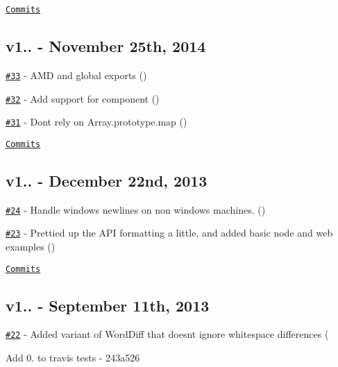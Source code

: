 \href{https://github.com/kpdecker/jsdiff/compare/v1.1.0...v1.2.0}{\tt Commits}

\subsection*{v1.. -\/ November 25th, 2014}


\begin{DoxyItemize}
\item \href{https://github.com/kpdecker/jsdiff/pull/33}{\tt \#33} -\/ A\+MD and global exports (\href{https://api.github.com/users/ovcharik}{\tt })
\item \href{https://github.com/kpdecker/jsdiff/pull/32}{\tt \#32} -\/ Add support for component (\href{https://api.github.com/users/vmariano}{\tt })
\item \href{https://github.com/kpdecker/jsdiff/pull/31}{\tt \#31} -\/ Don\textquotesingle{}t rely on Array.\+prototype.\+map (\href{https://api.github.com/users/papandreou}{\tt })
\end{DoxyItemize}

\href{https://github.com/kpdecker/jsdiff/compare/v1.0.8...v1.1.0}{\tt Commits}

\subsection*{v1.. -\/ December 22nd, 2013}


\begin{DoxyItemize}
\item \href{https://github.com/kpdecker/jsdiff/pull/24}{\tt \#24} -\/ Handle windows newlines on non windows machines. (\href{https://api.github.com/users/benogle}{\tt })
\item \href{https://github.com/kpdecker/jsdiff/pull/23}{\tt \#23} -\/ Prettied up the A\+PI formatting a little, and added basic node and web examples (\href{https://api.github.com/users/airportyh}{\tt })
\end{DoxyItemize}

\href{https://github.com/kpdecker/jsdiff/compare/v1.0.7...v1.0.8}{\tt Commits}

\subsection*{v1.. -\/ September 11th, 2013}


\begin{DoxyItemize}
\item \href{https://github.com/kpdecker/jsdiff/pull/22}{\tt \#22} -\/ Added variant of Word\+Diff that doesn\textquotesingle{}t ignore whitespace differences (\href{https://api.github.com/users/papandreou}{\tt }
\item Add 0. to travis tests -\/ 243a526
\end{DoxyItemize}

